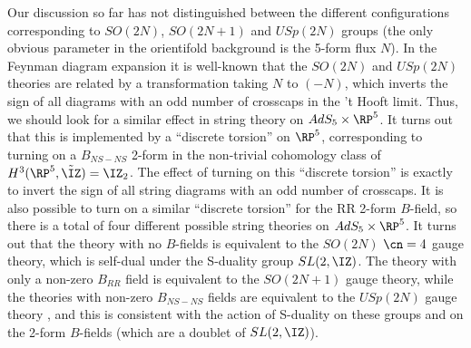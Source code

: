 Our discussion so far has not distinguished between the different
configurations corresponding to $SO(2N)$, $SO(2N+1)$ and $USp(2N)$
groups (the only obvious parameter in the orientifold background is
the 5-form flux $N$). In the Feynman diagram expansion it is
well-known \cite{Mkrtchian:1981bb,Cvitanovic:1982bq} that the $SO(2N)$
and $USp(2N)$ theories are related by a transformation taking $N$ to
$(-N)$, which inverts the sign of all diagrams with an odd number of
crosscaps in the 't Hooft limit. Thus, we should look for a similar
effect in string theory on $AdS_5\times \RP^5$. It turns out
\cite{Witten:1998xy} that this is implemented by a ``discrete
torsion'' on $\RP^5$, corresponding to turning on a $B_{NS-NS}$ 2-form
in the non-trivial cohomology class of $H^3(\RP^5, {\tilde \IZ}) =
\IZ_2$. The effect of turning on this ``discrete torsion'' is exactly
to invert the sign of all string diagrams with an odd number of
crosscaps. It is also possible to turn on a similar ``discrete
torsion'' for the RR 2-form $B$-field, so there is a total of four
different possible string theories on $AdS_5\times \RP^5$. It turns
out that the theory with no $B$-fields is equivalent to the $SO(2N)$
$\cn=4$ gauge theory, which is self-dual under the S-duality group
$SL(2,\IZ)$. The theory with only a non-zero $B_{RR}$ field is
equivalent to the $SO(2N+1)$ gauge theory, while the theories with
non-zero $B_{NS-NS}$ fields are equivalent to the $USp(2N)$ gauge
theory \cite{Witten:1998xy}, and this is consistent with the action of
S-duality on these groups and on the 2-form $B$-fields (which are a
doublet of $SL(2,\IZ)$).

